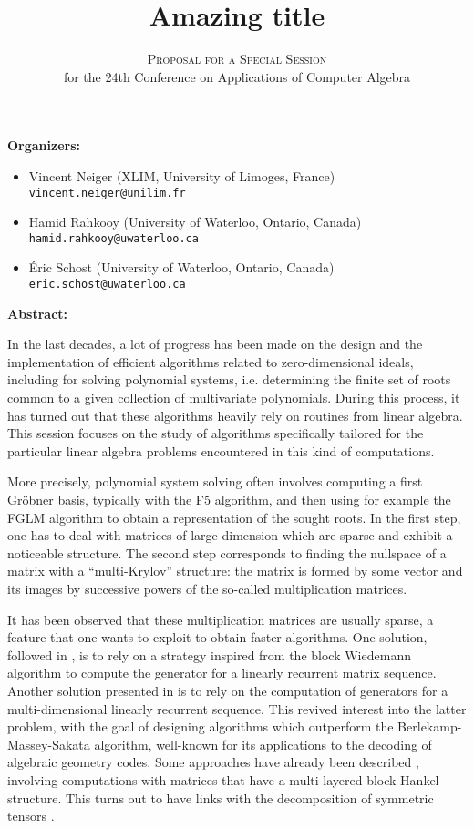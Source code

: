 \documentclass[12pt,english]{article}
\title{Amazing title}
\author{\textsc{Proposal for a Special Session} \\
  for the 24th Conference on Applications of Computer Algebra}
\date{}
\begin{document}
\maketitle

\textbf{Organizers:}
\begin{itemize}
  \item Vincent Neiger (XLIM, University of Limoges, France) \\
    {\small \verb+vincent.neiger@unilim.fr+}
  \item Hamid Rahkooy (University of Waterloo, Ontario, Canada) \\
    {\small \verb+hamid.rahkooy@uwaterloo.ca+}
  \item \'Eric Schost (University of Waterloo, Ontario, Canada) \\
    {\small \texttt{eric.schost@uwaterloo.ca}}
\end{itemize}

\textbf{Abstract:}

In the last decades, a lot of progress has been made on the design and the
implementation of efficient algorithms related to zero-dimensional ideals,
including for solving polynomial systems, i.e. determining the finite set of
roots common to a given collection of multivariate polynomials.  During this
process, it has turned out that these algorithms heavily rely on routines from
linear algebra.  This session focuses on the study of algorithms specifically
tailored for the particular linear algebra problems encountered in this kind of
computations.

More precisely, polynomial system solving often involves computing a first
Gr\"obner basis, typically with the F5 algorithm, and then using for example
the FGLM algorithm \cite{FaGiLaMo93} to obtain a representation of the sought
roots.  In the first step, one has to deal with matrices of large dimension
which are sparse and exhibit a noticeable structure.  The second step
corresponds to finding the nullspace of a matrix with a ``multi-Krylov''
structure: the matrix is formed by some vector and its images by successive
powers of the so-called multiplication matrices.

It has been observed that these multiplication matrices are usually sparse, a
feature that one wants to exploit to obtain faster algorithms.  One solution,
followed in \cite{Steel15}, is to rely on a strategy inspired from the block
Wiedemann algorithm \cite{Coppersmith94,Villard97a} to compute the generator
for a linearly recurrent matrix sequence.  Another solution presented in
\cite{FaMo17} is to rely on the computation of generators for a
multi-dimensional linearly recurrent sequence.  This revived interest into the
latter problem, with the goal of designing algorithms which outperform the
Berlekamp-Massey-Sakata algorithm, well-known for its applications to the
decoding of algebraic geometry codes.  Some approaches have already been
described \cite{BerBoyFau17,Mourrain17}, involving computations with matrices
that have a multi-layered block-Hankel structure.  This turns out to have links
with the decomposition of symmetric tensors \cite{BrCoMots10}.
\end{document}
